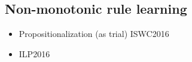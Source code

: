 \subsection{Non-monotonic rule learning}
\begin{itemize}
\item Propositionalization (as trial) ISWC2016
\item ILP2016

\end{itemize}


